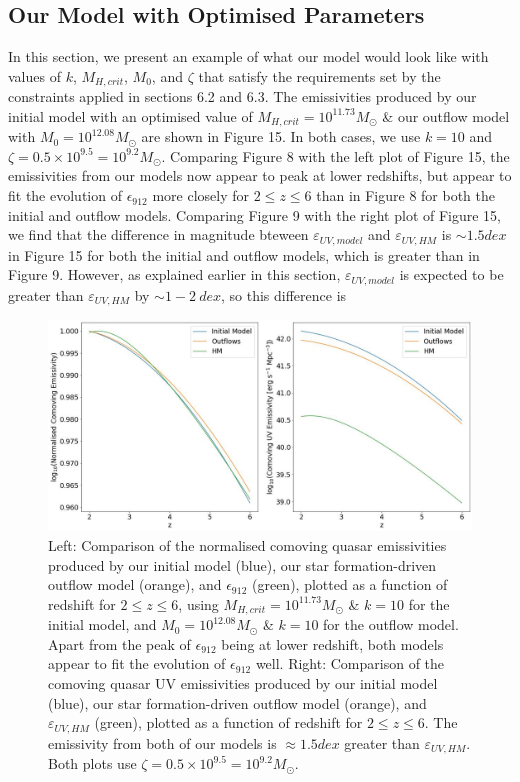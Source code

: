 \documentclass[12pt]{article}%
\begin{document}
\subsection{Our Model with Optimised Parameters}

In this section, we present an example of what our model would look like with values of $k$, $M_{H,crit}$, $M_0$, and $\zeta$ that satisfy the requirements set by the constraints applied in sections 6.2 and 6.3. The emissivities produced by our initial model with an optimised value of $M_{H,crit}=10^{11.73}M_\odot$ \& our outflow model with $M_0=10^{12.08}M_\odot$ are shown in Figure 15. In both cases, we use $k=10$ and $\zeta=0.5\times10^{9.5}=10^{9.2}M_\odot$. Comparing Figure 8 with the left plot of Figure 15, the emissivities from our models now appear to peak at lower redshifts, but appear to fit the evolution of $\epsilon_{912}$ more closely for $2\leq z\leq6$ than in Figure 8 for both the initial and outflow models. Comparing Figure 9 with the right plot of Figure 15, we find that the difference in magnitude bteween $\varepsilon_{UV,model}$ and $\varepsilon_{UV,HM}$ is $\sim1.5dex$ in Figure 15 for both the initial and outflow models, which is greater than in Figure 9. However, as explained earlier in this section, $\varepsilon_{UV,model}$ is expected to be greater than $\varepsilon_{UV,HM}$ by $\sim1-2\:dex$, so this difference is

\onecolumngrid


\begin{figure}[H]
\centering
\includegraphics[width=\linewidth]{Plot_14.jpeg}
\caption{Left: Comparison of the normalised comoving quasar emissivities produced by our initial model (blue), our star formation-driven outflow model (orange), and $\epsilon_{912}$ (green), plotted as a function of redshift for $2\leq z\leq6$, using $M_{H,crit}=10^{11.73}M_\odot$ \& $k=10$ for the initial model, and $M_0=10^{12.08}M_\odot$ \& $k=10$ for the outflow model. Apart from the peak of $\epsilon_{912}$ being at lower redshift, both models appear to fit the evolution of $\epsilon_{912}$ well. Right: Comparison of the comoving quasar UV emissivities produced by our initial model (blue), our star formation-driven outflow model (orange), and $\varepsilon_{UV,HM}$ (green), plotted as a function of redshift for $2\leq z\leq6$. The emissivity from both of our models is $\approx1.5dex$ greater than $\varepsilon_{UV,HM}$. Both plots use $\zeta=0.5\times10^{9.5}=10^{9.2}M_\odot$.}
\label{fig:15}
\end{figure}
\end{document}
